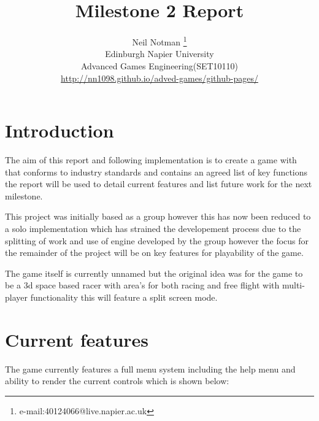 \documentclass[conference,backref=page]{acmsiggraph}
\title{Milestone 2 Report}
\author{Neil Notman \thanks{e-mail:40124066@live.napier.ac.uk} \\
Edinburgh Napier University\\
Advanced Games Engineering(SET10110) \\
\url{http://nn1098.github.io/adved-games/github-pages/}}
\begin{document}

\maketitle


\keywordlist





\section{Introduction}
The aim of this report and following implementation is to create a game with that conforms to industry standards and contains an agreed list of key functions the report will be used to detail current features and list future work for the next milestone.

This project was initially based as a group however this has now been reduced to a solo implementation which has strained the developement process due to the splitting of work and use of engine developed by the group however the focus for the remainder of the project will be on key features for playability of the game.     

The game itself is currently unnamed but the original idea was for the game to be a 3d space based racer with area's for both racing and free flight with multi-player functionality this will feature a split screen mode.   

\section{Current features}
The game currently features a full menu system including the help menu and ability to render the current controls which is shown below:
\end{document}
